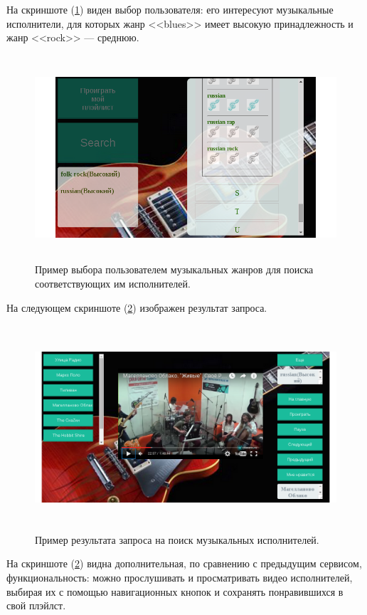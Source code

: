 На скриншоте (\ref{pic:lf-screen1}) виден выбор пользователя: его интересуют музыкальные исполнители, для которых жанр <<blues>> имеет
высокую принадлежность и жанр <<rock>> --- среднюю.
\begin{figure}[h]
\caption{Пример выбора пользователем музыкальных жанров для поиска соответствующих им исполнителей.}
\label{pic:lf-screen1}
\begin{center}
  \includegraphics[width=5in,height=3in]{pics/lastfm-interface.png}
\end{center}
\end{figure}

На следующем скриншоте (\ref{pic:lf-screen2}) изображен результат запроса.
\begin{figure}[h]
\caption{Пример результата запроса на поиск музыкальных исполнителей.}
\label{pic:lf-screen2}
\begin{center}
  \includegraphics[width=5in,height=3in]{pics/lastfm-rslt.png}
\end{center}
\end{figure}

На скриншоте (\ref{pic:lf-screen2}) видна дополнительная, по сравнению с
предыдущим сервисом, функциональность: можно прослушивать и просматривать
видео исполнителей, выбирая их с помощью навигационных кнопок и сохранять понравившихся в свой плэйлст.

